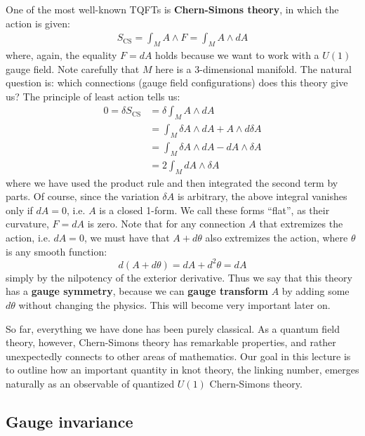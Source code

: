 \documentclass[12pt]{article}
\begin{document}
One of the most well-known TQFTs is \textbf{Chern-Simons theory}, in which the action is given:
\begin{align*}
    S_{\text{CS}}=\int_M A\wedge F=\int_M A\wedge dA
\end{align*}
where, again, the equality $F=dA$ holds because we want to work with a $U(1)$ gauge field. Note carefully
that $M$ here is a 3-dimensional manifold.
The natural question is: which connections (gauge field configurations) does this theory give us?
The principle of least action tells us:
\begin{align*}
    0=\delta S_{\text{CS}}&=\delta\int_M A\wedge dA\\
    &=\int_M \delta A\wedge dA + A\wedge d\delta A\\
    &=\int_M \delta A\wedge dA - dA \wedge \delta A\\
    &=2\int_M dA \wedge \delta A
\end{align*}
where we have used the product rule and then integrated the second term by parts. Of course, since the variation
$\delta A$ is arbitrary, the above integral vanishes only if $dA=0$, i.e. $A$ is a closed 1-form. We call these forms ``flat'', as their curvature, $F=dA$ is zero. 
Note that for any connection $A$ that extremizes the action, i.e. $dA=0$, we must have that $A+d\theta$	also extremizes the action, where $\theta$ is any smooth function:
\[d(A+d\theta)=dA+d^2\theta=dA\]
simply by the nilpotency of the exterior derivative.
Thus we say that this theory has a \textbf{gauge symmetry}, because we can \textbf{gauge transform} $A$ by adding some $d\theta$ without changing the physics. This will become very important later on.

So far, everything we have done has been purely classical. As a quantum field theory, however, Chern-Simons theory has remarkable properties, and rather unexpectedly
connects to other areas of mathematics. Our goal in this lecture is to outline how an important quantity in knot theory,
the linking number, emerges naturally as an observable of quantized $U(1)$  Chern-Simons theory.

\subsection*{Gauge invariance}
\end{document}
